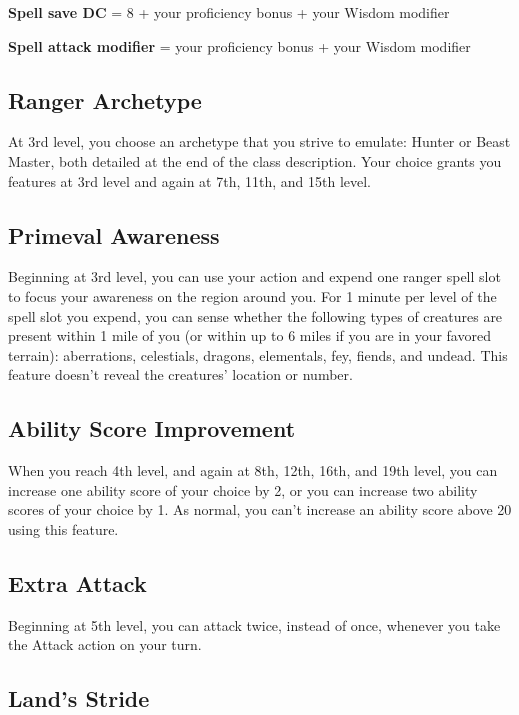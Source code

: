 \textbf{Spell save DC} = 8 + your proficiency bonus + your Wisdom modifier

\textbf{Spell attack modifier} = your proficiency bonus + your Wisdom modifier

\subsection{Ranger Archetype}

At 3rd level, you choose an archetype that you strive to emulate: Hunter or Beast Master, both detailed at the end of the class description. Your choice grants you features at 3rd level and again at 7th, 11th, and 15th level.

\subsection{Primeval Awareness}

Beginning at 3rd level, you can use your action and expend one ranger spell slot to focus your awareness on the region around you. For 1 minute per level of the spell slot you expend, you can sense whether the following types of creatures are present within 1 mile of you (or within up to 6 miles if you are in your favored terrain): aberrations, celestials, dragons, elementals, fey, fiends, and undead. This feature doesn't reveal the creatures' location or number.

\subsection{Ability Score Improvement}

When you reach 4th level, and again at 8th, 12th, 16th, and 19th level, you can increase one ability score of your choice by 2, or you can increase two ability scores of your choice by 1. As normal, you can't increase an ability score above 20 using this feature.

\subsection{Extra Attack}

Beginning at 5th level, you can attack twice, instead of once, whenever you take the Attack action on your turn.

\subsection{Land's Stride}

